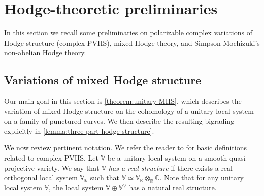 \documentclass[12 pt]{amsart}
\theoremstyle{plain}
\theoremstyle{definition}
\theoremstyle{remark}
\numberwithin{equation}{section}
\begin{document}




\section{Hodge-theoretic preliminaries}\label{section:Hodge-theoretic-preliminaries}
In this section we recall some preliminaries on polarizable complex variations
of Hodge structure (complex PVHS), mixed Hodge theory, and Simpson-Mochizuki's non-abelian Hodge theory.

\subsection{Variations of mixed Hodge structure}
\label{subsection:vmhs}
Our main goal in this section is \autoref{theorem:unitary-MHS},
which describes the variation of mixed Hodge structure on the cohomology of a
unitary local system on a family of punctured curves. 
We then describe the resulting bigrading explicitly in
\autoref{lemma:three-part-hodge-structure}.


We now review pertinent notation.
We refer the reader to \cite[\S5]{LL:geometric-local-systems} for basic definitions
related to complex PVHS.
Let $\mathbb V$ be a unitary local system on a smooth quasi-projective variety.
We say that \emph{$\mathbb{V}$ has a real structure} if there exists a real orthogonal local system $\mathbb{V}_\mathbb{R}$ such that 
$\mathbb{V}\simeq \mathbb{V}_\mathbb{R}\otimes_\mathbb{R}\mathbb{C}$. Note that
for any unitary local system $\mathbb{V}$, the local system
$\mathbb{V}\oplus\mathbb{V}^\vee$ has a natural real structure.
\end{document}
